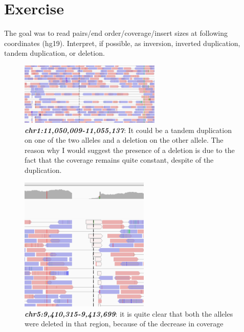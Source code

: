 \section*{Exercise}

The goal was to read pairs/end order/coverage/insert sizes at following
coordinates (hg19). Interpret, if possible, as inversion, inverted duplication,
tandem duplication, or deletion.

\begin{figure}[H]
    \caption{\textit{\textbf{chr1:11,050,009-11,055,137}}: It could be a tandem duplication on one of the two alleles and a deletion on the other allele. The reason why I would suggest the presence of a deletion is due to the fact that the coverage remains quite constant, despite of the duplication.}
    \centering
    \includegraphics[width=0.6\textwidth]{pos1.PNG}
\end{figure}

\begin{figure}[H]
    \caption{\textbf{\textit{chr5:9,410,315-9,413,699}}: it is quite clear that both the alleles were deleted in that region, because of the decrease in coverage}
    \centering
    \includegraphics[width=0.55\textwidth]{pos2.PNG}
\end{figure}

